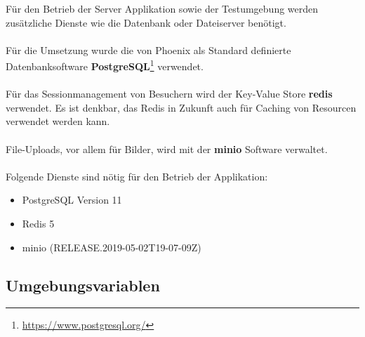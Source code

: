 Für den Betrieb der Server Applikation sowie der Testumgebung werden
zusätzliche Dienste wie die Datenbank oder Dateiserver benötigt.\\
\\
Für die Umsetzung wurde die von Phoenix als Standard definierte
Datenbanksoftware \textbf{PostgreSQL}\footnote{\url{https://www.postgresql.org/}} verwendet.\\
\\
Für das Sessionmanagement von Besuchern wird der Key-Value Store \textbf{redis}
verwendet. Es ist denkbar, das Redis in Zukunft auch für Caching von Resourcen
verwendet werden kann.\\
\\
File-Uploads, vor allem für Bilder, wird mit der \textbf{minio} Software
verwaltet.\\
\\
\noindent{}Folgende Dienste sind nötig für den Betrieb der Applikation:

\begin{itemize}
  \tightlist{}
  \item{} PostgreSQL Version 11
  \item{} Redis 5
  \item{} minio (RELEASE.2019-05-02T19-07-09Z)
\end{itemize}

\clearpage
\subsection{Umgebungsvariablen}

